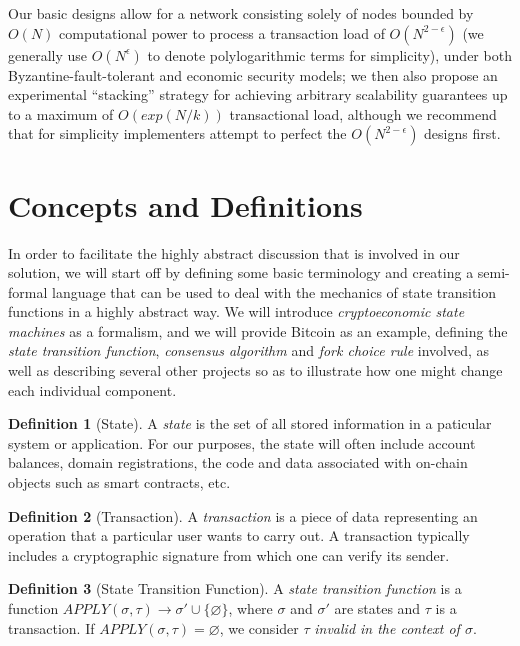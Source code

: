 \documentclass[11pt,a4paper]{article}
\theoremstyle{plain}
\theoremstyle{definition}
\newtheorem{defn}{Definition}[section]
\theoremstyle{remark}
\begin{document}
Our basic designs allow for a network consisting solely of nodes bounded by $O(N)$ computational power to process a transaction load of $O(N^{2-\epsilon})$ (we generally use $O(N^\epsilon)$ to denote polylogarithmic terms for simplicity), under both Byzantine-fault-tolerant and economic security models; we then also propose an experimental ``stacking'' strategy for achieving arbitrary scalability guarantees up to a maximum of $O(exp(N/k))$ transactional load, although we recommend that for simplicity implementers attempt to perfect the $O(N^{2-\epsilon})$ designs first.

\section{Concepts and Definitions}

In order to facilitate the highly abstract discussion that is involved in our solution, we will start off by defining some basic terminology and creating a semi-formal language that can be used to deal with the mechanics of state transition functions in a highly abstract way. We will introduce \emph{cryptoeconomic state machines} as a formalism, and we will provide Bitcoin as an example, defining the \emph{state transition function}, \emph{consensus algorithm} and \emph{fork choice rule} involved, as well as describing several other projects so as to illustrate how one might change each individual component.

\begin{defn}[State]
A \emph{state} is the set of all stored information in a paticular system or application. For our purposes, the state will often include account balances, domain registrations, the code and data associated with on-chain objects such as smart contracts, etc.
\end{defn}

\begin{defn}[Transaction]
A \emph{transaction} is a piece of data representing an operation that a particular user wants to carry out. A transaction typically includes a cryptographic signature from which one can verify its sender.
\end{defn}

\begin{defn}[State Transition Function]
A \emph{state transition function} is a function $APPLY(\sigma, \tau) \rightarrow \sigma' \cup \{\varnothing\}$, where $\sigma$ and $\sigma'$ are states and $\tau$ is a transaction. If $APPLY(\sigma, \tau) = \varnothing$, we consider $\tau$ \emph{invalid in the context of $\sigma$}.
\end{defn}
\end{document}

